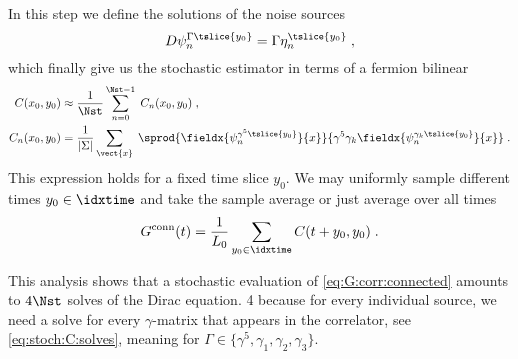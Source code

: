 In this step we define the solutions of the noise sources
\begin{equation} \label{eq:stoch:C:solves}
D \psi_{n}^{\Gamma \tslice{y_0}} = \Gamma \eta_n^{\tslice{y_0}} \;,
\end{equation}
which finally give us the stochastic estimator in terms of a fermion bilinear
\begin{align} \label{eq:stoch:C:full:final}
C(x_0, y_0)
&\approx \frac{1}{\Nst} \sum_{n=0}^{\Nst-1} \; C_n(x_0, y_0) \;, \\
C_n(x_0, y_0)
&= \frac{1}{ \lvert \Sigma \rvert } \sum_{\vect{x}} \;
\sprod{
  \fieldx{\psi_{n}^{\gamma^{5} \tslice{y_0}}}{x}
}{
  \gamma^{5}
  \gamma_k
  \fieldx{\psi_{n}^{\gamma_k \tslice{y_0}}}{x}
} \;.
\end{align}
This expression holds for a fixed time slice $y_0$.
We may uniformly sample different times $y_0 \in \idxtime$ and take the sample average or just average over all times
\begin{equation}
G^{\text{conn}}(t) = \frac{1}{L_0} \sum_{y_0 \in \idxtime}  C(t + y_0, y_0) \;.
\end{equation}

This analysis shows that a stochastic evaluation of \cref{eq:G:corr:connected} amounts to $4 \Nst$ solves of the Dirac equation. \num{4} because for every individual source, we need a solve for every $\gamma$-matrix that appears in the correlator, see \cref{eq:stoch:C:solves}, meaning for $\Gamma \in \{ \gamma^{5}, \gamma_1, \gamma_2, \gamma_3 \}$.




